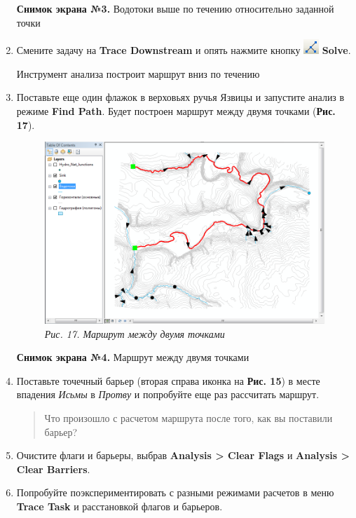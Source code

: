\documentclass[]{book}
\theoremstyle{definition}
\theoremstyle{definition}
\theoremstyle{definition}
\theoremstyle{remark}
\begin{document}
\begin{enumerate}
  \textbf{Снимок экрана №3.} Водотоки выше по течению относительно
  заданной точки
\item
  Смените задачу на \textbf{Trace Downstream} и опять нажмите кнопку
  \includegraphics{images/Ex13/image29.png} \textbf{Solve}.

  Инструмент анализа построит маршрут вниз по течению
\item
  Поставьте еще один флажок в верховьях ручья Язвицы и запустите анализ
  в режиме \textbf{Find Path}. Будет построен маршрут между двумя
  точками (\textbf{Рис. 17}).

  \begin{figure}
  \centering
  \includegraphics{images/Ex13/image31.png}
  \caption{\emph{Рис. 17. Маршрут между двумя точками}}
  \end{figure}

  \textbf{Снимок экрана №4.} Маршрут между двумя точками
\item
  Поставьте точечный барьер (вторая справа иконка на \textbf{Рис. 15}) в
  месте впадения \emph{Исьмы} в \emph{Протву} и попробуйте еще раз
  рассчитать маршрут.

  \begin{quote}
  Что произошло с расчетом маршрута после того, как вы поставили барьер?
  \end{quote}
\item
  Очистите флаги и барьеры, выбрав \textbf{Analysis \textgreater{} Clear
  Flags} и \textbf{Analysis \textgreater{} Clear Barriers}.
\item
  Попробуйте поэкспериментировать с разными режимами расчетов в меню
  \textbf{Trace Task} и расстановкой флагов и барьеров.


\end{enumerate}
\end{document}
